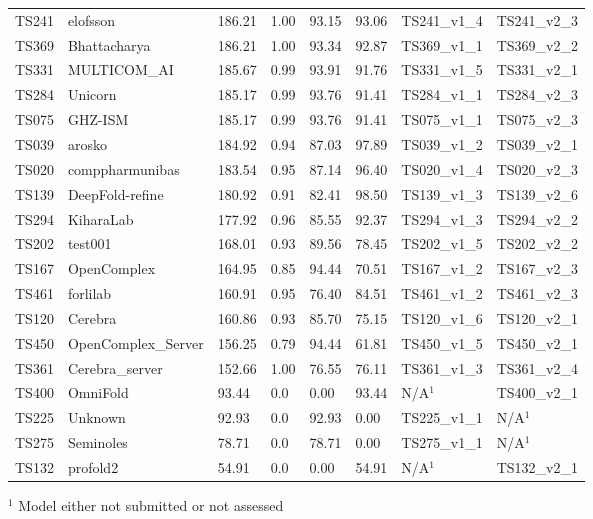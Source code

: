 \begin{table}[ht]
{\begin{tabular}{llllllll}
TS241 & elofsson & 186.21 & 1.00 & 93.15 & 93.06 & TS241\_v1\_4 & TS241\_v2\_3 \\ 
TS369 & Bhattacharya & 186.21 & 1.00 & 93.34 & 92.87 & TS369\_v1\_1 & TS369\_v2\_2 \\ 
TS331 & MULTICOM\_AI & 185.67 & 0.99 & 93.91 & 91.76 & TS331\_v1\_5 & TS331\_v2\_1 \\ 
TS284 & Unicorn & 185.17 & 0.99 & 93.76 & 91.41 & TS284\_v1\_1 & TS284\_v2\_3 \\ 
TS075 & GHZ-ISM & 185.17 & 0.99 & 93.76 & 91.41 & TS075\_v1\_1 & TS075\_v2\_3 \\ 
TS039 & arosko & 184.92 & 0.94 & 87.03 & 97.89 & TS039\_v1\_2 & TS039\_v2\_1 \\ 
TS020 & comppharmunibas & 183.54 & 0.95 & 87.14 & 96.40 & TS020\_v1\_4 & TS020\_v2\_3 \\ 
TS139 & DeepFold-refine & 180.92 & 0.91 & 82.41 & 98.50 & TS139\_v1\_3 & TS139\_v2\_6 \\ 
TS294 & KiharaLab & 177.92 & 0.96 & 85.55 & 92.37 & TS294\_v1\_3 & TS294\_v2\_2 \\ 
TS202 & test001 & 168.01 & 0.93 & 89.56 & 78.45 & TS202\_v1\_5 & TS202\_v2\_2 \\ 
TS167 & OpenComplex & 164.95 & 0.85 & 94.44 & 70.51 & TS167\_v1\_2 & TS167\_v2\_3 \\ 
TS461 & forlilab & 160.91 & 0.95 & 76.40 & 84.51 & TS461\_v1\_2 & TS461\_v2\_3 \\ 
TS120 & Cerebra & 160.86 & 0.93 & 85.70 & 75.15 & TS120\_v1\_6 & TS120\_v2\_1 \\ 
TS450 & OpenComplex\_Server & 156.25 & 0.79 & 94.44 & 61.81 & TS450\_v1\_5 & TS450\_v2\_1 \\ 
TS361 & Cerebra\_server & 152.66 & 1.00 & 76.55 & 76.11 & TS361\_v1\_3 & TS361\_v2\_4 \\ 
TS400 & OmniFold & 93.44 & 0.0 & 0.00 & 93.44 & N/A$^{1}$ & TS400\_v2\_1 \\ 
TS225 & Unknown & 92.93 & 0.0 & 92.93 & 0.00 & TS225\_v1\_1 & N/A$^{1}$ \\ 
TS275 & Seminoles & 78.71 & 0.0 & 78.71 & 0.00 & TS275\_v1\_1 & N/A$^{1}$ \\ 
TS132 & profold2 & 54.91 & 0.0 & 0.00 & 54.91 & N/A$^{1}$ & TS132\_v2\_1 \\ 
\bottomrule
\end{tabular}%
}
\begin{flushleft}\footnotesize $^{1}$ Model either not submitted or not assessed\end{flushleft}
\end{table}

